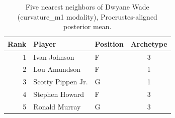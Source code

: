\begin{table}[htbp]
  \centering\small
  \begin{tabular}{rllc}
    \toprule
    Rank & Player & Position & Archetype \\
    \midrule
    1 & Ivan Johnson & F & 3 \\
    2 & Lou Amundson & F & 1 \\
    3 & Scotty Pippen Jr. & G & 1 \\
    4 & Stephen Howard & F & 3 \\
    5 & Ronald Murray & G & 3 \\
    \bottomrule
  \end{tabular}
  \caption{Five nearest neighbors of Dwyane Wade (curvature_m1 modality), Procrustes-aligned posterior mean.}
  \label{tab:Dwyane_Wade_neighbors_curvature_m1}
\end{table}


